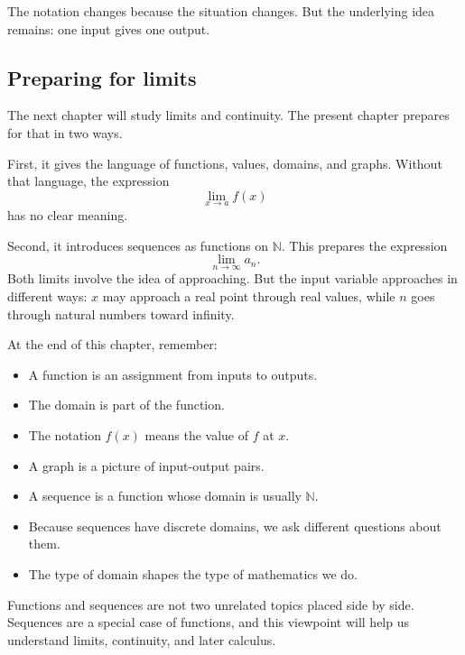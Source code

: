 \begin{remarkbox}
The notation changes because the situation changes. But the underlying idea remains: one input gives one output.
\end{remarkbox}

\subsection*{Preparing for limits}

The next chapter will study limits and continuity. The present chapter prepares for that in two ways.

First, it gives the language of functions, values, domains, and graphs. Without that language, the expression
\[
\lim_{x\to a} f(x)
\]
has no clear meaning.

Second, it introduces sequences as functions on \(\mathbb{N}\). This prepares the expression
\[
\lim_{n\to\infty} a_n.
\]
Both limits involve the idea of approaching. But the input variable approaches in different ways: \(x\) may approach a real point through real values, while \(n\) goes through natural numbers toward infinity.

\begin{summarybox}
At the end of this chapter, remember:
\begin{itemize}
\item A function is an assignment from inputs to outputs.
\item The domain is part of the function.
\item The notation \(f(x)\) means the value of \(f\) at \(x\).
\item A graph is a picture of input-output pairs.
\item A sequence is a function whose domain is usually \(\mathbb{N}\).
\item Because sequences have discrete domains, we ask different questions about them.
\item The type of domain shapes the type of mathematics we do.
\end{itemize}
\end{summarybox}

Functions and sequences are not two unrelated topics placed side by side. Sequences are a special case of functions, and this viewpoint will help us understand limits, continuity, and later calculus.